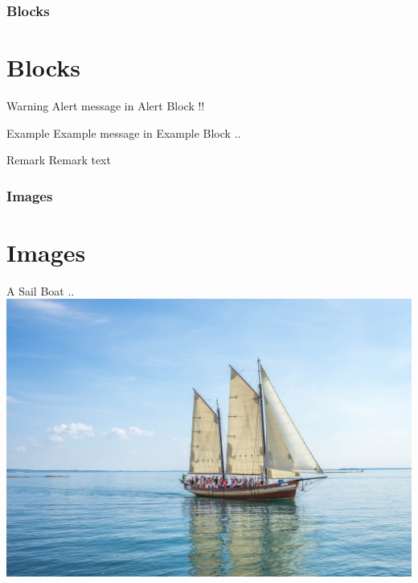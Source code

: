 \documentclass[12pt,[aspectratio=169]{beamer}
\begin{document}
\begin{frame}
    \frametitle{Blocks}
    \section{Blocks}
    \begin{alertblock}{Warning}
        Alert message in Alert Block !!
    \end{alertblock}
    
    \begin{exampleblock}{Example}
        Example message in Example Block ..
    \end{exampleblock}
    
    \begin{block}{Remark}
        Remark text
    \end{block}

\end{frame}

\begin{frame}[label=images,shrink=5]
    \frametitle{Images}
    \section{Images}
    A Sail Boat ..
    \includegraphics[width=0.8\linewidth]{boat.jpg}
\end{frame}
\end{document}
